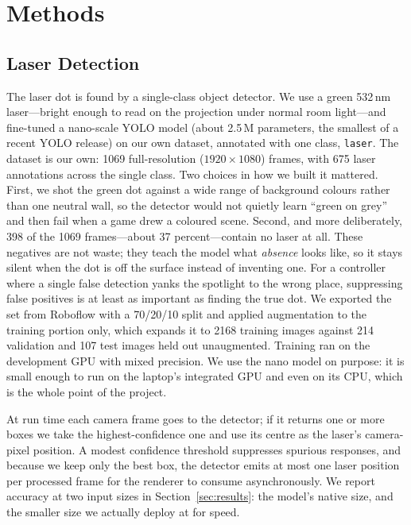 \documentclass[conference]{IEEEtran}
\begin{document}
\section{Methods}\label{sec:methods}

\subsection{Laser Detection}\label{sec:detect}
The laser dot is found by a single-class object detector. We use a green
532\,nm laser---bright enough to read on the projection under normal room
light---and fine-tuned a nano-scale YOLO model (about 2.5\,M parameters, the
smallest of a recent YOLO release) on our own dataset, annotated with one class,
\texttt{laser}. The dataset is our own: 1069 full-resolution
($1920\times1080$) frames, with 675 laser annotations across the single class. Two
choices in how we built it mattered. First, we shot the green dot against a wide
range of background colours rather than one neutral wall, so the detector would not
quietly learn ``green on grey'' and then fail when a game drew a coloured scene.
Second, and more deliberately, 398 of the 1069 frames---about 37 percent---contain
no laser at all. These negatives are not waste; they teach the model what
\emph{absence} looks like, so it stays silent when the dot is off the surface
instead of inventing one. For a controller where a single false detection yanks the
spotlight to the wrong place, suppressing false positives is at least as important
as finding the true dot. We exported the set from Roboflow with a 70/20/10 split
and applied augmentation to the training portion only, which expands it to 2168
training images against 214 validation and 107 test images held out unaugmented.
Training ran on the development GPU with mixed precision. We use the nano model on
purpose: it is small enough to run on the laptop's integrated GPU and even on its
CPU, which is the whole point of the project.

At run time each camera frame goes to the detector; if it returns one or more
boxes we take the highest-confidence one and use its centre as the laser's
camera-pixel position. A modest confidence threshold suppresses spurious
responses, and because we keep only the best box, the detector emits at most one
laser position per processed frame for the renderer to consume asynchronously. We
report accuracy at two input sizes in Section~\ref{sec:results}: the model's
native size, and the smaller size we actually deploy at for speed.
\end{document}
